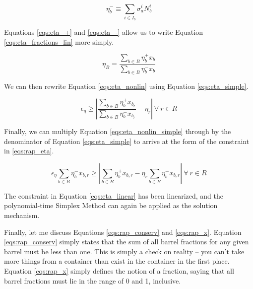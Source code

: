 \begin{equation}
\label{eqs:eta_-}
\eta_{b}^{-} \equiv \sum_{i \in I_{b}} \sigma_{a}^{i} N_{b}^{i}
\end{equation}

Equations \ref{eqs:eta_+} and \ref{eqs:eta_-} allow us to write
Equation \ref{eqs:eta_fractions_lin} more simply.

\begin{equation}
\label{eqs:eta_simple}
\eta_{B} = \frac{\sum_{b \in B} \eta_{b}^{+} x_{b}}
                {\sum_{b \in B} \eta_{b}^{-} x_{b}}
\end{equation}

We can then rewrite Equation \ref{eqs:eta_nonlin} using
Equation \ref{eqs:eta_simple}.

\begin{equation}
\label{eqs:eta_nonlin_simple}
\epsilon_{\eta} \geq \left| 
\frac{\sum_{b \in B} \eta_{b}^{+} x_{b_r}}
     {\sum_{b \in B} \eta_{b}^{-} x_{b_r}}
- \eta_{r} \right|
\: \forall \: r \in R
\end{equation}

Finally, we can multiply Equation \ref{eqs:eta_nonlin_simple} through by the
denominator of Equation \ref{eqs:eta_simple} to arrive at the form of the
constraint in \ref{eqs:rap_eta}.

\begin{equation}
\label{eqs:eta_linear}
\epsilon_{\eta} \sum_{b \in B} \eta_{b}^{-} x_{b,r} \geq
\left| \sum_{b \in B} \eta_{b}^{+} x_{b,r}
- \eta_{r} \sum_{b \in B} \eta_{b}^{-} x_{b,r} \right|
\: \forall \: r \in R
\end{equation}

The constraint in Equation \ref{eqs:eta_linear} has been linearized, and the
polynomial-time Simplex Method can again be applied as the solution mechanism. 

Finally, let me discuss Equations \ref{eqs:rap_conserv} and \ref{eqs:rap_x}.
Equation \ref{eqs:rap_conserv} simply states that the sum of all barrel
fractions for any given barrel must be less than one. This is simply a check on
reality -- you can't take more things from a container than exist in the
container in the first place. Equation \ref{eqs:rap_x} simply defines the notion of
a fraction, saying that all barrel fractions must lie in the range of 0 and 1,
inclusive.
